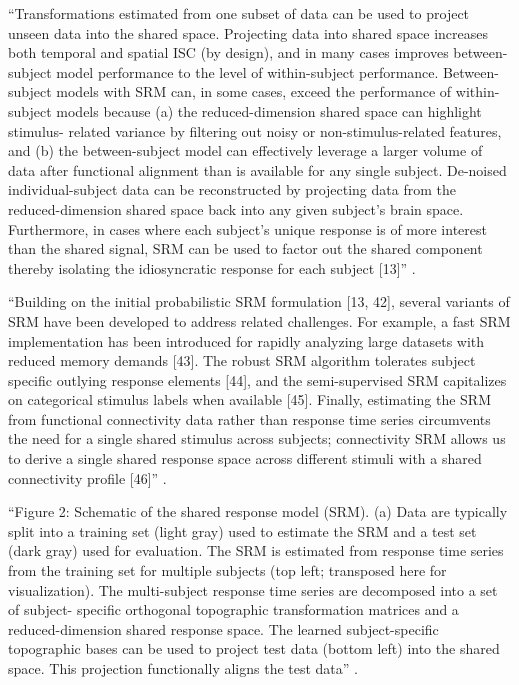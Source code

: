 {``Transformations estimated from one subset of data can be used to project
unseen data into the shared space. Projecting data into shared space increases
both temporal and spatial ISC (by design), and in many cases improves
between-subject model performance to the level of within-subject performance.
Between-subject models with SRM can, in some cases, exceed the performance of
within-subject models because (a) the reduced-dimension shared space can
highlight stimulus- related variance by filtering out noisy or
non-stimulus-related features, and (b) the between-subject model can effectively
leverage a larger volume of data after functional alignment than is available
for any single subject. De-noised individual-subject data can be reconstructed
by projecting data from the reduced-dimension shared space back into any given
subject’s brain space.  Furthermore, in cases where each subject’s unique
response is of more interest than the shared signal, SRM can be used to factor
out the shared component thereby isolating the idiosyncratic response for each
subject [13]'' \citep{kumar2020brainiak}.

``Building on the initial probabilistic SRM formulation [13, 42], several
variants of SRM have been developed to address related challenges. For example,
a fast SRM implementation has been introduced for rapidly analyzing large
datasets with reduced memory demands [43]. The robust SRM algorithm tolerates
subject specific outlying response elements [44], and the semi-supervised SRM
capitalizes on categorical stimulus labels when available [45]. Finally,
estimating the SRM from functional connectivity data rather than response time
series circumvents the need for a single shared stimulus across subjects;
connectivity SRM allows us to derive a single shared response space across
different stimuli with a shared connectivity profile [46]''
\citep{kumar2020brainiak}.

``Figure 2: Schematic of the shared response model (SRM). (a) Data are typically
split into a training set (light gray) used to estimate the SRM and a test set
(dark gray) used for evaluation. The SRM is estimated from response time series
from the training set for multiple subjects (top left; transposed here for
visualization). The multi-subject response time series are decomposed into a set
of subject- specific orthogonal topographic transformation matrices and a
reduced-dimension shared response space. The learned subject-specific
topographic bases can be used to project test data (bottom left) into the shared
space. This projection functionally aligns the test data''
\citep{kumar2020brainiak}.

}
